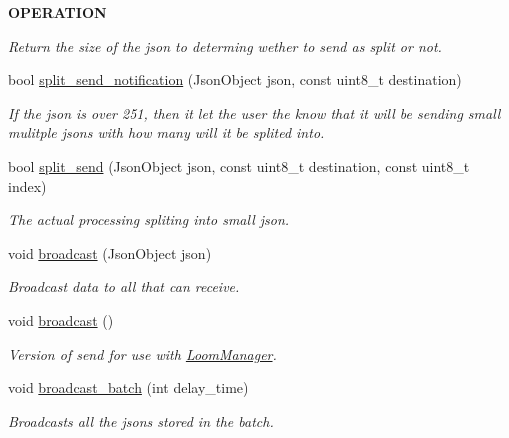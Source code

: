 \begin{Indent}{\bf O\+P\+E\+R\+A\+T\+I\+ON}
\begin{DoxyCompactItemize}
\begin{DoxyCompactList}\small\item\em Return the size of the json to determing wether to send as split or not. \end{DoxyCompactList}\item 
bool \hyperlink{class_loom_comm_plat_abc9ba333b93167dda5dd721eb4a04d02}{split\+\_\+send\+\_\+notification} (Json\+Object json, const uint8\+\_\+t destination)
\begin{DoxyCompactList}\small\item\em If the json is over 251, then it let the user the know that it will be sending small mulitple jsons with how many will it be splited into. \end{DoxyCompactList}\item 
bool \hyperlink{class_loom_comm_plat_a7a0d2c230d977bfb8f286aab7bd8469e}{split\+\_\+send} (Json\+Object json, const uint8\+\_\+t destination, const uint8\+\_\+t index)
\begin{DoxyCompactList}\small\item\em The actual processing spliting into small json. \end{DoxyCompactList}\item 
void \hyperlink{class_loom_comm_plat_a5098505add4d65102472aeeb7dc442bb}{broadcast} (Json\+Object json)
\begin{DoxyCompactList}\small\item\em Broadcast data to all that can receive. \end{DoxyCompactList}\item 
void \hyperlink{class_loom_comm_plat_a30796b7e6bbeb5f0c9cbf112b578c27f}{broadcast} ()
\begin{DoxyCompactList}\small\item\em Version of send for use with \hyperlink{class_loom_manager}{Loom\+Manager}. \end{DoxyCompactList}\item 
void \hyperlink{class_loom_comm_plat_a9fdc18392e011fe3bd41b37a5d3d8999}{broadcast\+\_\+batch} (int delay\+\_\+time)
\begin{DoxyCompactList}\small\item\em Broadcasts all the jsons stored in the batch. \end{DoxyCompactList}\end{DoxyCompactItemize}
\end{Indent}
